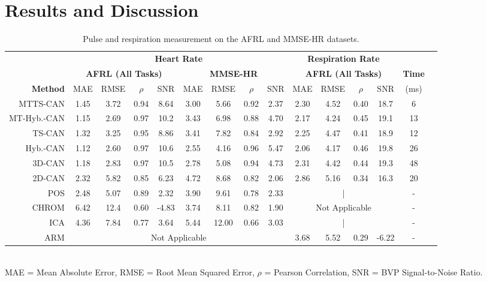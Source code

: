 \documentclass{article}
\begin{document}
\section{Results and Discussion}
\begin{table*}[t]
	\footnotesize
	\caption{Pulse and respiration measurement on the AFRL and MMSE-HR datasets.}
	\label{tab:AFRL_MMSE}
	\centering
	\setlength\tabcolsep{3pt} \begin{tabular}{r|cccc|cccc|cccc|cc}
	\toprule
		& \multicolumn{8}{c}{\textbf{Heart Rate}} & \multicolumn{4}{c}{\textbf{Respiration Rate}} \\
		& \multicolumn{4}{c}{\textbf{AFRL (All Tasks) }} &  \multicolumn{4}{c}{\textbf{MMSE-HR}}  & \multicolumn{4}{c}{\textbf{AFRL (All Tasks) }} & \textbf{Time}  \\
        \textbf{Method} & MAE & RMSE & $\rho$ & SNR & MAE & RMSE & $\rho$ & SNR & MAE & RMSE & $\rho$ & SNR & (ms) & \\ \hline \hline
        MTTS-CAN & 1.45 &  3.72 & 0.94 & 8.64 & 3.00 & 5.66 & 0.92 & 2.37 & 2.30 & 4.52 & 0.40 & 18.7 & 6 \\
        MT-Hyb.-CAN & 1.15 & 2.69 & 0.97 & 10.2 & 3.43 & 6.98 & 0.88 & 4.70 & 2.17 & 4.24 & 0.45 & 19.1 & 13 \\ 
        TS-CAN & 1.32 &  3.25 & 0.95 & 8.86 & 3.41 & 7.82 & 0.84  & 2.92  & 2.25 & 4.47 & 0.41 & 18.9 & 12 \\
        Hyb.-CAN & 1.12 & 2.60 & 0.97 & 10.6 & 2.55 & 4.16 & 0.96 & 5.47  & 2.06 & 4.17 & 0.46 & 19.8 & 26 \\
        3D-CAN & 1.18 & 2.83 & 0.97 & 10.5 & 2.78 & 5.08 & 0.94 & 4.73 & 2.31 & 4.42 & 0.44 & 19.3 & 48  \\ \hdashline
        2D-CAN \citep{chen2018deepphys} & 2.32 & 5.82 & 0.85 & 6.23 & 4.72 & 8.68 &  0.82 & 2.06  & 2.86 & 5.16 & 0.34 & 16.3 & 20  \\
        POS \citep{wang2016algorithmic} & 2.48 & 5.07 & 0.89 & 2.32 & 3.90 & 9.61 & 0.78 & 2.33 & \multicolumn{4}{c|}{|} & - \\
        CHROM \citep{de2013robust} & 6.42 & 12.4  & 0.60  & -4.83 & 3.74 & 8.11 & 0.82 & 1.90 & \multicolumn{4}{c|}{Not Applicable} & -\\
        ICA \citep{poh2010advancements} & 4.36 & 7.84 & 0.77 & 3.64 & 5.44 & 12.00 & 0.66 & 3.03 &  \multicolumn{4}{c|}{|} & - \\ 
        ARM \citep{tarassenko2014non} & \multicolumn{8}{c}{\multirow{1}{*}{Not Applicable}}  & 3.68 & 5.52 & 0.29 & -6.22 & - \\
        \bottomrule 
   \end{tabular}
   \\
   \tiny
   MAE = Mean Absolute Error, RMSE = Root Mean Squared Error, $\rho$ = Pearson Correlation, SNR = BVP Signal-to-Noise Ratio.
   \vspace{-0.4cm}
\end{table*}
\end{document}
